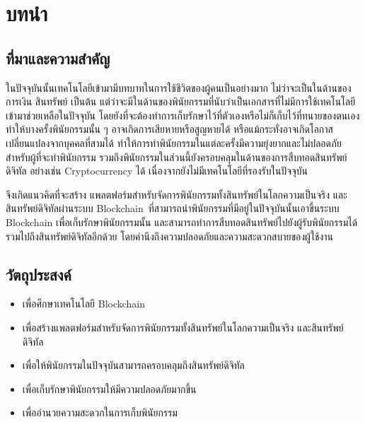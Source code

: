 \documentclass[12pt,oneside,openright,a4paper]{cpe-thai-project}
\begin{document}



\chapter{บทนำ}

\section{ที่มาและความสำคัญ}

\tab ในปัจจุบันนั้นเทคโนโลยีเข้ามามีบทบาทในการใช้ชีวิตของผู้คนเป็นอย่างมาก ไม่ว่าจะเป็นในด้านของ การเงิน สินทรัพย์ เป็นต้น แต่ว่าจะมีในด้านของพินัยกรรมที่นับว่าเป็นเอกสารที่ไม่มีการใช้เทคโนโลยีเข้ามาช่วยเหลือในปัจจุบัน โดยยังที่จะต้องทำการเก็บรักษาไว้ที่ตัวเองหรือไม่ก็เก็บไว้ที่ทนายของตนเองทำให้บางครั้งพินัยกรรมนั้น ๆ อาจเกิดการเสียหายหรือสูญหายได้ หรือแม้กระทั่งอาจเกิดโอกาสเปลี่ยนแปลงจากบุคคลที่สามได้ ทำให้การทำพินัยกรรมในแต่ละครั้งมีความยุ่งยากและไม่ปลอดภัยสำหรับผู้ที่จะทำพินัยกรรม รวมถึงพินัยกรรมในส่วนนี้ยังครอบคลุมในด้านของการสืบทอดสินทรัพย์ดิจิทัล อย่างเช่น Cryptocurrency ได้ เนื่องจากยังไม่มีเทคโนโลยีที่รองรับในปัจจุบัน

\tab จึงเกิดแนวคิดที่จะสร้าง แพลตฟอร์มสำหรับจัดการพินัยกรรมทั้งสินทรัพย์ในโลกความเป็นจริง และสินทรัพย์ดิจิทัลผ่านระบบ Blockchain\ ที่สามารถนำพินัยกรรมที่มีอยู่ในปัจจุบันนั้นเอาขึ้นระบบ Blockchain เพื่อเก็บรักษาพินัยกรรมนั้น และสามารถทำการสืบทอดสินทรัพย์ไปยังผู้รับพินัยกรรมได้ รวมไปถึงสินทรัพย์ดิจิทัลอีกด้วย โดยคำนึงถึงความปลอดภัยและความสะดวกสบายของผู้ใช้งาน


\section{วัตถุประสงค์}

\begin{itemize}
\item เพื่อศึกษาเทคโนโลยี Blockchain
\item เพื่อสร้างแพลตฟอร์มสำหรับจัดการพินัยกรรมทั้งสินทรัพย์ในโลกความเป็นจริง และสินทรัพย์ดิจิทัล
\item เพื่อให้พินัยกรรมในปัจจุบันสามารถครอบคลุมถึงสินทรัพย์ดิจิทัล
\item เพื่อเก็บรักษาพินัยกรรมให้มีความปลอดภัยมากขึ้น
\item เพื่ออำนวยความสะดวกในการเก็บพินัยกรรม
\end{itemize}
\end{document}

